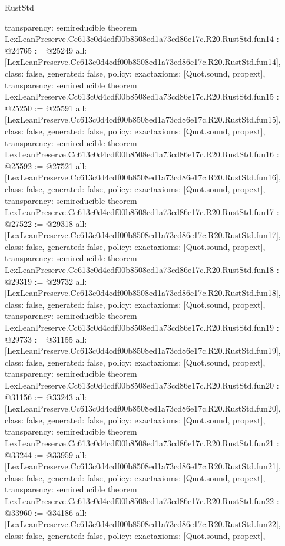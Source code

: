 \begin{lexlean}{RustStd}
\begin{coremodule}
{  transparency: semireducible
}
theorem LexLeanPreserve.Cc613c0d4cdf00b8508ed1a73cd86e17c.R20.RustStd.fun14 : @24765 := @25249 {
  all: [LexLeanPreserve.Cc613c0d4cdf00b8508ed1a73cd86e17c.R20.RustStd.fun14],
  class: false,
  generated: false,
  policy: exact{axioms: [Quot.sound, propext]},
  transparency: semireducible
}
theorem LexLeanPreserve.Cc613c0d4cdf00b8508ed1a73cd86e17c.R20.RustStd.fun15 : @25250 := @25591 {
  all: [LexLeanPreserve.Cc613c0d4cdf00b8508ed1a73cd86e17c.R20.RustStd.fun15],
  class: false,
  generated: false,
  policy: exact{axioms: [Quot.sound, propext]},
  transparency: semireducible
}
theorem LexLeanPreserve.Cc613c0d4cdf00b8508ed1a73cd86e17c.R20.RustStd.fun16 : @25592 := @27521 {
  all: [LexLeanPreserve.Cc613c0d4cdf00b8508ed1a73cd86e17c.R20.RustStd.fun16],
  class: false,
  generated: false,
  policy: exact{axioms: [Quot.sound, propext]},
  transparency: semireducible
}
theorem LexLeanPreserve.Cc613c0d4cdf00b8508ed1a73cd86e17c.R20.RustStd.fun17 : @27522 := @29318 {
  all: [LexLeanPreserve.Cc613c0d4cdf00b8508ed1a73cd86e17c.R20.RustStd.fun17],
  class: false,
  generated: false,
  policy: exact{axioms: [Quot.sound, propext]},
  transparency: semireducible
}
theorem LexLeanPreserve.Cc613c0d4cdf00b8508ed1a73cd86e17c.R20.RustStd.fun18 : @29319 := @29732 {
  all: [LexLeanPreserve.Cc613c0d4cdf00b8508ed1a73cd86e17c.R20.RustStd.fun18],
  class: false,
  generated: false,
  policy: exact{axioms: [Quot.sound, propext]},
  transparency: semireducible
}
theorem LexLeanPreserve.Cc613c0d4cdf00b8508ed1a73cd86e17c.R20.RustStd.fun19 : @29733 := @31155 {
  all: [LexLeanPreserve.Cc613c0d4cdf00b8508ed1a73cd86e17c.R20.RustStd.fun19],
  class: false,
  generated: false,
  policy: exact{axioms: [Quot.sound, propext]},
  transparency: semireducible
}
theorem LexLeanPreserve.Cc613c0d4cdf00b8508ed1a73cd86e17c.R20.RustStd.fun20 : @31156 := @33243 {
  all: [LexLeanPreserve.Cc613c0d4cdf00b8508ed1a73cd86e17c.R20.RustStd.fun20],
  class: false,
  generated: false,
  policy: exact{axioms: [Quot.sound, propext]},
  transparency: semireducible
}
theorem LexLeanPreserve.Cc613c0d4cdf00b8508ed1a73cd86e17c.R20.RustStd.fun21 : @33244 := @33959 {
  all: [LexLeanPreserve.Cc613c0d4cdf00b8508ed1a73cd86e17c.R20.RustStd.fun21],
  class: false,
  generated: false,
  policy: exact{axioms: [Quot.sound, propext]},
  transparency: semireducible
}
theorem LexLeanPreserve.Cc613c0d4cdf00b8508ed1a73cd86e17c.R20.RustStd.fun22 : @33960 := @34186 {
  all: [LexLeanPreserve.Cc613c0d4cdf00b8508ed1a73cd86e17c.R20.RustStd.fun22],
  class: false,
  generated: false,
  policy: exact{axioms: [Quot.sound, propext]},
}
\end{coremodule}
\end{lexlean}
